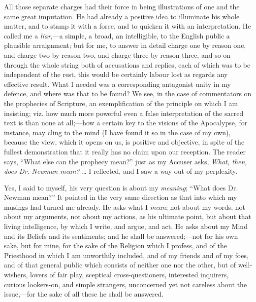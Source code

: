 All those separate charges had their force in being
illustrations of one and the same great imputation. He had already a positive idea to illuminate his whole matter, and to
stamp it with a force,
and to quicken it with an interpretation. He called me a \emph{liar},—a
simple, a broad, an intelligible, to the English public a plausible
arraignment; but for me, to answer in detail charge one by reason one,
and charge two by reason two, and charge three by reason three, and so
on through
the whole string both of accusations and replies, each of which was to
be independent of the rest, this would be certainly labour lost as
regards any effective result. What I needed was a corresponding
antagonist unity in my defence, and where was that to be found? We
see, in the case of commentators on the prophecies of Scripture, an
exemplification of the principle on which I am insisting; viz. how
much more powerful even a false interpretation of the sacred text is
than none at all;—how a certain key to the visions of the
Apocalypse, for instance, may cling to the mind (I have found it
so in the case of my own), because the view, which it opens on us, is
positive and objective, in spite of the fullest demonstration that it really
has no
claim upon our reception.
The reader says, ``What else can the prophecy mean?''
just as my Accuser asks, \emph{What, then, does Dr. Newman mean?}
… I reflected, and I saw a way out of my perplexity.

Yes, I said to myself, his very question is about my \emph{meaning};
``What does Dr. Newman mean?'' It pointed in the very same direction as that into which my musings had
turned me already. He asks what I \emph{mean}; not about my words, not
about my arguments, not about my actions, as his ultimate point, but
about that living intelligence, by which I write, and argue, and act.
He asks about my Mind and its Beliefs and its sentiments; and he shall be answered;—not for his own sake, but for
mine, for the sake of the Religion which I profess, and of the
Priesthood in which I am unworthily included, and of my friends and of
my foes, and of that general public which consists of neither one nor
the other, but of well-wishers, lovers of fair play, sceptical
cross-questioners, interested inquirers, curious lookers-on, and
simple strangers, unconcerned yet not careless about the issue,—for
the sake of all these he shall be answered.

